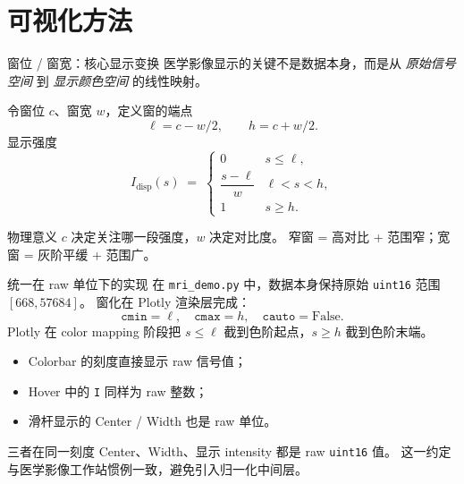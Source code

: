\documentclass[aspectratio=169,11pt]{ctexbeamer}
\begin{document}
\section{可视化方法}

\begin{frame}{窗位 / 窗宽：核心显示变换}
  \small
  医学影像显示的关键不是数据本身，而是从 \emph{原始信号空间} 到 \emph{显示颜色空间} 的线性映射。

  令窗位 $c$、窗宽 $w$，定义窗的端点
  \[
    \ell = c - w/2,\qquad
    h = c + w/2.
  \]
  显示强度
  \[
    I_{\text{disp}}(s) \;=\;
    \begin{cases}
      0 & s\le \ell,\\
      \dfrac{s-\ell}{w} & \ell<s<h,\\
      1 & s\ge h.
    \end{cases}
  \]

  \begin{block}{物理意义}
    $c$ 决定关注哪一段强度，$w$ 决定对比度。
    窄窗 = 高对比 + 范围窄；宽窗 = 灰阶平缓 + 范围广。
  \end{block}
\end{frame}

\begin{frame}{统一在 raw 单位下的实现}
  \small
  在 \texttt{mri\_demo.py} 中，数据本身保持原始 \texttt{uint16} 范围 $[668,57684]$。
  窗化在 Plotly 渲染层完成：
  \[
    \texttt{cmin}=\ell,\quad
    \texttt{cmax}=h,\quad
    \texttt{cauto}=\text{False}.
  \]
  Plotly 在 color mapping 阶段把 $s\le \ell$ 截到色阶起点，$s\ge h$ 截到色阶末端。

  \begin{itemize}
    \item Colorbar 的刻度直接显示 raw 信号值；
    \item Hover 中的 \texttt{I} 同样为 raw 整数；
    \item 滑杆显示的 Center / Width 也是 raw 单位。
  \end{itemize}

  \begin{block}{三者在同一刻度}
    Center、Width、显示 intensity 都是 raw \texttt{uint16} 值。
    这一约定与医学影像工作站惯例一致，避免引入归一化中间层。
  \end{block}
\end{frame}
\end{document}
